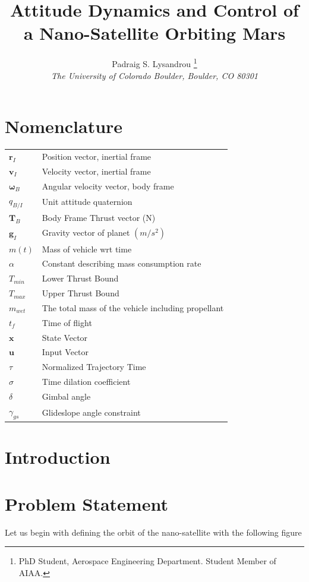 \documentclass[paper]{aiaaNew}
\title{Attitude Dynamics and Control of a Nano-Satellite Orbiting Mars}
\author{Padraig S. Lysandrou
  \thanks{PhD Student, Aerospace Engineering Department.  Student Member of AIAA.}
  \\
  \emph{\normalsize The University of Colorado Boulder, Boulder, CO 80301}
}
\begin{document}
\maketitle




\section*{Nomenclature}
{\renewcommand\arraystretch{1.0}
\noindent\begin{longtable*}{@{}l @{\quad=\quad} l@{}}
$\mathbf{r}_I$    & Position vector, inertial frame\\
$\mathbf{v}_I$    & Velocity vector, inertial frame\\
$\mathbf{\omega}_B$   & Angular velocity vector, body frame\\
$q_{B/I}$   & Unit attitude quaternion\\
$\textbf{T}_B$  & Body Frame Thrust vector (N)\\
$\mathbf{g}_I$      &Gravity vector of planet $(m/s^2)$ \\
$m(t)$        &Mass of vehicle wrt time\\
$\alpha$  & Constant describing mass consumption rate \\
$T_{min}$   & Lower Thrust Bound\\
$T_{max}$   & Upper Thrust Bound\\
$m_{wet}$   & The total mass of the vehicle including propellant\\
$t_f$     & Time of flight\\
$\mathbf{x}$    & State Vector\\
$\mathbf{u}$    & Input Vector\\
$\tau$  & Normalized Trajectory Time \\
$\sigma$  & Time dilation coefficient \\
$\delta$    & Gimbal angle \\
$\gamma_{gs}$   & Glideslope angle constraint\\
\end{longtable*}}



\clearpage
\section{Introduction}

\section{Problem Statement}
Let us begin with defining the orbit of the nano-satellite with the following figure
\end{document}
